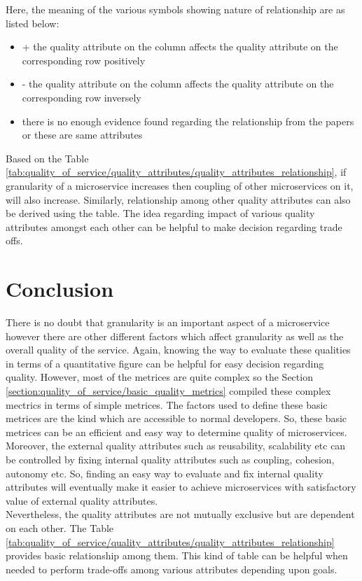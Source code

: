 {{{{{{{{{{Here, the meaning of the various symbols showing nature of relationship are as listed below:
  \\
\begin{itemize}[leftmargin=.5in]
\item + the quality attribute on the column affects the quality attribute on the corresponding row positively
\item - the quality attribute on the column affects the quality attribute on the corresponding row inversely
\item   there is no enough evidence found regarding the relationship from the papers or these are same attributes
\end{itemize}
Based on the Table \ref{tab:quality_of_service/quality_attributes/quality_attributes_relationship}, if granularity of a microservice increases then coupling of other microservices on it, will also increase. Similarly, relationship among other quality attributes can also be derived using the table.
The idea regarding impact of various quality attributes amongst each other can be helpful to make decision regarding trade offs.

\section{Conclusion}\label{section:quality_of_service/conclusion}
There is no doubt that granularity is an important aspect of a microservice however there are other different factors which affect granularity as well as the overall quality of the service. Again, knowing the way to evaluate these qualities in terms of a quantitative figure can be helpful for easy decision regarding quality. However, most of the metrices are quite complex so the Section \ref{section:quality_of_service/basic_quality_metrics} compiled these complex mectrics in terms of simple metrices. The factors used to define these basic metrices are the kind which are accessible to normal developers. So, these basic metrices can be an efficient and easy way to determine quality of microservices. \\
Moreover, the external quality attributes such as reusability, scalability etc can be controlled by fixing internal quality attributes such as coupling, cohesion, autonomy etc. So, finding an easy way to evaluate and fix internal quality attributes will eventually make it easier to achieve microservices with satisfactory value of external quality attributes.\\
Nevertheless, the quality attributes are not mutually exclusive but are dependent on each other. The Table \ref{tab:quality_of_service/quality_attributes/quality_attributes_relationship} provides basic relationship among them. This kind of table can be helpful when needed to perform trade-offs among various attributes depending upon goals.
}}}}}}}}}}
